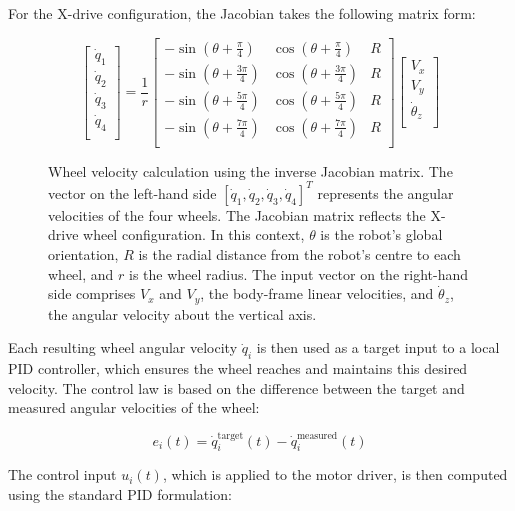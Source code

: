 For the X-drive configuration, the Jacobian takes the following matrix form:

\begin{figure}[H]
\[
\begin{bmatrix}
\dot{q}_1 \\
\dot{q}_2 \\
\dot{q}_3 \\
\dot{q}_4 \\
\end{bmatrix}
=
\frac{1}{r}
\begin{bmatrix}
-\sin(\theta + \frac{\pi}{4}) & \cos(\theta + \frac{\pi}{4}) & R \\
-\sin(\theta + \frac{3\pi}{4}) & \cos(\theta + \frac{3\pi}{4}) & R \\
-\sin(\theta + \frac{5\pi}{4}) & \cos(\theta + \frac{5\pi}{4}) & R \\
-\sin(\theta + \frac{7\pi}{4}) & \cos(\theta + \frac{7\pi}{4}) & R \\
\end{bmatrix}
\begin{bmatrix}
V_x \\ 
V_y \\
\dot{\theta}_z \\
\end{bmatrix}
\]
\caption{Wheel velocity calculation using the inverse Jacobian matrix. The vector on the left-hand side \( [\dot{q}_1, \dot{q}_2, \dot{q}_3, \dot{q}_4]^T \) represents the angular velocities of the four wheels. The Jacobian matrix reflects the X-drive wheel configuration. In this context, \( \theta \) is the robot's global orientation, \( R \) is the radial distance from the robot's centre to each wheel, and \( r \) is the wheel radius. The input vector on the right-hand side comprises \( V_x \) and \( V_y \), the body-frame linear velocities, and \( \dot{\theta}_z \), the angular velocity about the vertical axis.}
\label{fig:matrix-wheel}
\end{figure}

Each resulting wheel angular velocity \( \dot{q}_i \) is then used as a target input to a local PID controller, which ensures the wheel reaches and maintains this desired velocity. The control law is based on the difference between the target and measured angular velocities of the wheel:

\[
e_i(t) = \dot{q}_i^{\text{target}}(t) - \dot{q}_i^{\text{measured}}(t)
\]

The control input \( u_i(t) \), which is applied to the motor driver, is then computed using the standard PID formulation:

